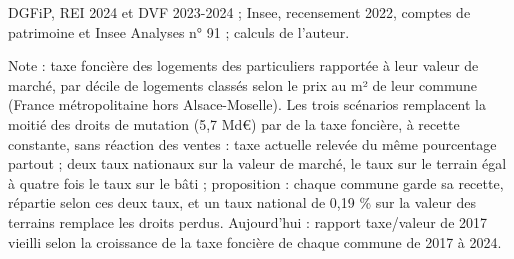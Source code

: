 DGFiP, REI 2024 et DVF 2023-2024 ; Insee, recensement 2022, comptes de patrimoine et Insee Analyses n° 91 ; calculs de l'auteur.\par Note : taxe foncière des logements des particuliers rapportée à leur valeur de marché, par décile de logements classés selon le prix au m² de leur commune (France métropolitaine hors Alsace-Moselle). Les trois scénarios remplacent la moitié des droits de mutation (5,7 Md\euro{}) par de la taxe foncière, à recette constante, sans réaction des ventes : taxe actuelle relevée du même pourcentage partout ; deux taux nationaux sur la valeur de marché, le taux sur le terrain égal à quatre fois le taux sur le bâti ; proposition : chaque commune garde sa recette, répartie selon ces deux taux, et un taux national de 0,19 \% sur la valeur des terrains remplace les droits perdus. Aujourd'hui : rapport taxe/valeur de 2017 vieilli selon la croissance de la taxe foncière de chaque commune de 2017 à 2024.
